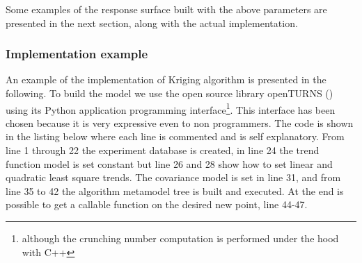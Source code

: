 Some examples of the response surface built with the above parameters are presented in the next section, along with the actual implementation.

\subsubsection{Implementation example}
An example of the implementation of Kriging algorithm is presented in the following. To build the model we use the open source library openTURNS (\citet{openturns}) using its Python application programming interface\footnote{although the crunching number computation is performed under the hood with C++}. This interface has been chosen because it is very expressive even to non programmers. 
The code is shown in the listing below where each line is commented and is self explanatory. From line 1 through 22 the experiment database is created, in line 24 the trend function model is set constant but line 26 and 28 show how to set linear and quadratic least square trends. The covariance model is set in line 31, and from line 35 to 42 the algorithm metamodel tree is built and executed. At the end is possible to get a callable function on the desired new point, line 44-47.




